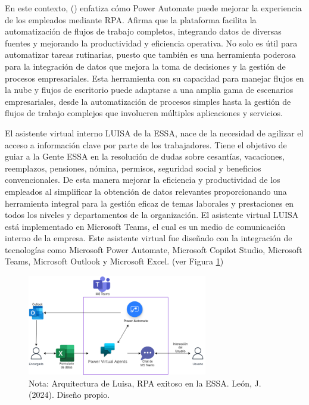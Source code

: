 \documentclass[letter,oneside,12pt,spanish]{report}
\begin{document}
\noindent En este contexto, (\cite{vartiainen2024leanrpa}) enfatiza cómo Power Automate puede mejorar la experiencia de los empleados mediante RPA. Afirma que la plataforma facilita la automatización de flujos de trabajo completos, integrando datos de diversas fuentes y mejorando la productividad y eficiencia operativa. No solo es útil para automatizar tareas rutinarias, puesto que también es una herramienta poderosa para la integración de datos que mejora la toma de decisiones y la gestión de procesos empresariales. Esta herramienta con su capacidad para manejar flujos en la nube y flujos de escritorio puede adaptarse a una amplia gama de escenarios empresariales, desde la automatización de procesos simples hasta la gestión de flujos de trabajo complejos que involucren múltiples aplicaciones y servicios.

\noindent El asistente virtual interno LUISA de la ESSA, nace de la necesidad de agilizar el acceso a información clave por parte de los trabajadores. Tiene el objetivo de guiar a la Gente ESSA en la resolución de dudas sobre cesantías, vacaciones, reemplazos, pensiones, nómina, permisos, seguridad social y beneficios convencionales. De esta manera mejorar la eficiencia y productividad de los empleados al simplificar la obtención de datos relevantes proporcionando una herramienta integral para la gestión eficaz de temas laborales y prestaciones en todos los niveles y departamentos de la organización. El asistente virtual LUISA está implementado en Microsoft Teams, el cual es un medio de comunicación interno de la empresa. Este asistente virtual fue diseñado con la integración de tecnologías como Microsoft Power Automate, Microsoft Copilot Studio, Microsoft Teams, Microsoft Outlook y Microsoft Excel. (ver Figura \ref{fig:LuisaArquitectura})

\begin{figure}[ht]
    \centering
    \includegraphics[width=0.7\textwidth]{Figs/arquitectura luisa.png}
    \label{fig:LuisaArquitectura}
    \\Nota: Arquitectura de Luisa, RPA exitoso en la ESSA. León, J. (2024). Diseño propio.
\end{figure}
\end{document}
